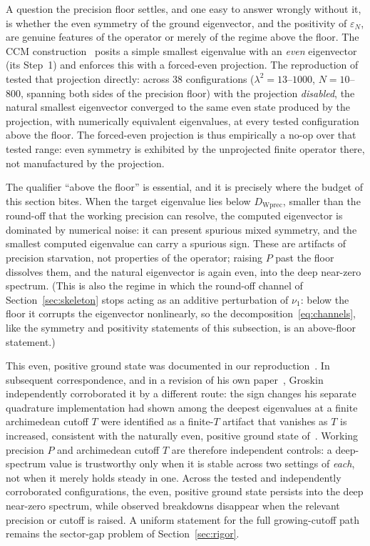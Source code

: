 \documentclass[11pt,a4paper]{article}
\begin{document}
A question the precision floor settles, and one easy to answer wrongly
without it, is whether the even symmetry of the ground eigenvector, and the
positivity of $\varepsilon_N$, are genuine features of the operator or merely of
the regime above the floor. The CCM construction~\cite{CCM2025} posits a simple
smallest eigenvalue with an \emph{even} eigenvector (its Step~1) and enforces
this with a forced-even projection. The reproduction of~\cite{AndrewsA} tested
that projection directly: across $38$ configurations ($\lambda^2=13$--$1000$,
$N=10$--$800$, spanning both sides of the precision floor) with the projection
\emph{disabled}, the natural smallest eigenvector converged to the same even
state produced by the projection, with numerically equivalent eigenvalues,
at every tested configuration above the floor. The forced-even projection is
thus empirically a no-op over that tested range: even symmetry is exhibited by
the unprojected finite operator there, not manufactured by the projection.

The qualifier ``above the floor'' is essential, and it is precisely where the
budget of this section bites. When the target eigenvalue lies below
$D_{\mathrm{Wprec}}$, smaller than the round-off that the working precision
can resolve, the computed eigenvector is dominated by numerical noise: it can
present spurious mixed symmetry, and the smallest computed eigenvalue can carry
a spurious sign. These are artifacts of precision starvation, not properties of
the operator; raising $P$ past the floor dissolves them, and the natural
eigenvector is again even, into the deep near-zero spectrum. (This is also the
regime in which the round-off channel of Section~\ref{sec:skeleton} stops
acting as an additive perturbation of $\nu_1$: below the floor it corrupts the
eigenvector nonlinearly, so the decomposition~\eqref{eq:channels}, like the
symmetry and positivity statements of this subsection, is an above-floor
statement.)

This even, positive ground state was documented in our reproduction~\cite{AndrewsA}.
In subsequent correspondence, and in a revision of his own paper~\cite{Groskin2026},
Groskin independently corroborated it by a different route: the sign changes his
separate quadrature implementation had shown among the deepest eigenvalues at a
finite archimedean cutoff $T$ were identified as a finite-$T$ artifact that
vanishes as $T$ is increased, consistent with the naturally even, positive ground
state of~\cite{AndrewsA}. Working precision $P$ and archimedean cutoff $T$ are
therefore independent controls: a deep-spectrum value is trustworthy only when it
is stable across two settings of \emph{each}, not when it merely holds steady in
one. Across the tested and independently corroborated configurations, the even,
positive ground state persists into the deep near-zero spectrum, while observed
breakdowns disappear when the relevant precision or cutoff is raised. A uniform
statement for the full growing-cutoff path remains the sector-gap problem of
Section~\ref{sec:rigor}.
\end{document}
